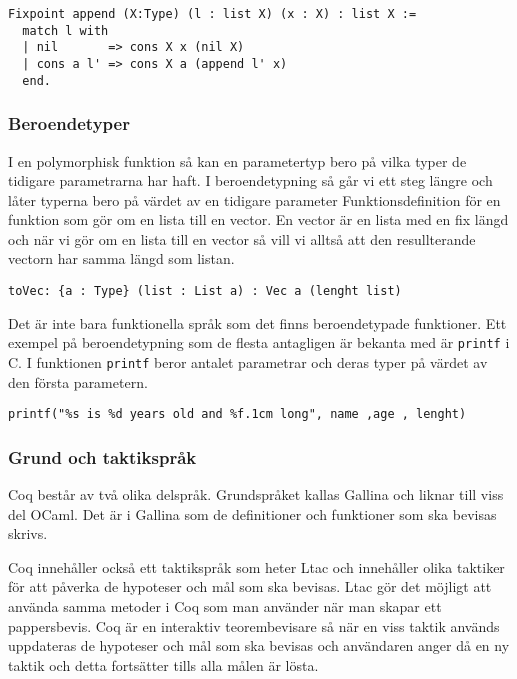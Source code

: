 \begin{itemize}
\begin{verbatim}
Fixpoint append (X:Type) (l : list X) (x : X) : list X :=
  match l with
  | nil       => cons X x (nil X)
  | cons a l' => cons X a (append l' x)
  end.
\end{verbatim}

\subsubsection{Beroendetyper}
I en polymorphisk funktion så kan en parametertyp bero på vilka typer de
tidigare parametrarna har haft. I beroendetypning så går vi ett steg längre och
låter typerna bero på värdet av en tidigare parameter
Funktionsdefinition för en funktion som gör om en lista till en vector. En
vector är en lista med en fix längd och när vi gör om en lista till en vector
så vill vi alltså att den resullterande vectorn har samma längd som listan.
\begin{verbatim}
toVec: {a : Type} (list : List a) : Vec a (lenght list)
\end{verbatim}

Det är inte bara funktionella språk som det finns beroendetypade funktioner.
Ett exempel på beroendetypning som de flesta antagligen är bekanta med är
\texttt{printf} i C. I funktionen \texttt{printf} beror antalet parametrar och
deras typer på värdet av den första parametern.

\begin{verbatim}
printf("%s is %d years old and %f.1cm long", name ,age , lenght)
\end{verbatim}

\begin{comment}
CoqArt
http://mattam.org/research/publications/Programming_with_Dependent_Types_in_Coq-PPS-260209.pdf
** DONE Grund och taktikspråk
   CLOSED: [2013-05-10 fre 10:41]
\end{comment}

\subsubsection{Grund och taktikspråk}
Coq består av två olika delspråk. Grundspråket kallas Gallina och liknar till
viss del OCaml. Det är i Gallina som de definitioner och funktioner som ska
bevisas skrivs.

Coq innehåller också ett taktikspråk som heter Ltac och innehåller olika
taktiker för att påverka de hypoteser och mål som ska bevisas. Ltac gör det
möjligt att använda samma metoder i Coq som man använder när man skapar ett
pappersbevis.
Coq är en interaktiv teorembevisare så när en viss taktik används uppdateras de
hypoteser och mål som ska bevisas och användaren anger då en ny taktik och
detta fortsätter tills alla målen är lösta.


\end{itemize}
